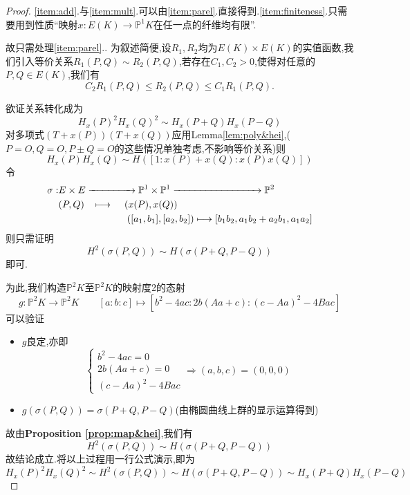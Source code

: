 \documentclass[12pt,A4paper,oneside,reqno]{amsart}
\numberwithin{equation}{section}
\theoremstyle{definition}
\theoremstyle{plain}
\theoremstyle{plain}
\numberwithin{equation}{section}
\theoremstyle{remark}
\begin{document}
\begin{proof}
	\ref{item:add}.与\ref{item:mult}.可以由\ref{item:parel}.直接得到.\ref{item:finiteness}.只需要用到性质“映射$x:E(K) \longrightarrow \mathbb{P}^1K$在任一点的纤维均有限”.
	
	故只需处理\ref{item:parel}.. 为叙述简便,设$R_1,R_2$均为$E(K) \times E(K)$的实值函数,我们引入等价关系$R_1(P,Q) \sim R_2(P,Q)$,若存在$C_1,C_2>0$,使得对任意的$P,Q \in E(K)$,我们有
	$$C_2R_1(P,Q) \leqslant R_2(P,Q) \leqslant C_1R_1(P,Q).$$
	
	欲证关系转化成为
	$$H_x(P)^2H_x(Q)^2 \sim H_x(P+Q)H_x(P-Q)$$
	对多项式$(T+x(P))(T+x(Q))$应用Lemma\ref*{lem:poly&hei},($P=O,Q=O,P \pm Q=O$的这些情况单独考虑,不影响等价关系)则
	$$H_x(P)H_x(Q) \sim H\left([1:x(P)+x(Q):x(P)x(Q)]\right)$$
	令
	\begin{equation*}
	\begin{aligned}
	\sigma:&E \times E \xrightarrow{\hspace*{1.5cm}} \mathbb{P}^1 \times \mathbb{P}^1 \xrightarrow{\hspace*{3cm}} \mathbb{P}^2\\
	&(P,Q) \hspace{3mm}\longmapsto\hspace{4mm} (x(P),x(Q))\\
	&\hspace{2.5cm}([a_1,b_1],[a_2,b_2]) \longmapsto [b_1b_2,a_1b_2+a_2b_1,a_1a_2]
	\end{aligned}
	\end{equation*}
	则只需证明
	$$H^2(\sigma(P,Q)) \sim H(\sigma(P+Q,P-Q))$$
	即可.
	
	为此,我们构造$\mathbb{P}^2K$至$\mathbb{P}^2K$的映射度2的态射
	$$g:\mathbb{P}^2K \longrightarrow \mathbb{P}^2K \qquad [a:b:c] \longmapsto [b^2-4ac: 2b(Aa+c):(c-Aa)^2-4Bac]$$
	可以验证
	\begin{itemize}
		\item $g$良定,亦即
		$$\begin{cases}
		b^2-4ac=0\\
		2b(Aa+c)=0\\
		(c-Aa)^2-4Bac
		\end{cases} \Longrightarrow (a,b,c)=(0,0,0)$$
		\item $g(\sigma(P,Q))=\sigma(P+Q,P-Q)$(由椭圆曲线上群的显示运算得到)
	\end{itemize}
故由\textbf{Proposition \ref{prop:map&hei}},我们有
$$H^2(\sigma(P,Q)) \sim H(\sigma(P+Q,P-Q))$$
故结论成立.将以上过程用一行公式演示,即为
$$H_x(P)^2H_x(Q)^2 \sim H^2(\sigma(P,Q)) \sim H(\sigma(P+Q,P-Q)) \sim H_x(P+Q)H_x(P-Q)$$
\end{proof}
\end{document}
